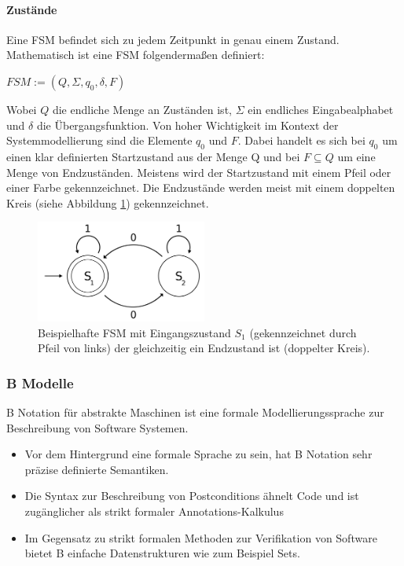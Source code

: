 \paragraph{Zustände}
Eine FSM befindet sich zu jedem Zeitpunkt in genau einem Zustand. Mathematisch ist eine FSM folgendermaßen definiert: 

\begin{center}
$FSM := (Q, \Sigma, q_0, \delta, F)$
\end{center}

Wobei $Q$ die endliche Menge an Zuständen ist, $\Sigma$ ein endliches Eingabealphabet und $\delta$ die Übergangsfunktion. Von hoher Wichtigkeit im Kontext der Systemmodellierung sind die Elemente $q_0$ und $F$. Dabei handelt es sich bei $q_0$ um einen klar definierten Startzustand aus der Menge Q und bei $F \subseteq Q$ um eine Menge von Endzuständen. Meistens wird der Startzustand mit einem Pfeil oder einer Farbe gekennzeichnet. Die Endzustände werden meist mit einem doppelten Kreis (siehe Abbildung \ref{fig:fsm_example}) gekennzeichnet.

\begin{figure}[h] 
  \centering
     \includegraphics[width=0.5\textwidth]{figures/FSM_example.png}
  \caption{Beispielhafte FSM mit Eingangszustand $S_1$ (gekennzeichnet durch Pfeil von links) der gleichzeitig ein Endzustand ist (doppelter Kreis).}
  \label{fig:fsm_example}
\end{figure}

\subsubsection{B Modelle}
B Notation für abstrakte Maschinen ist eine formale Modellierungssprache zur Beschreibung von Software Systemen.
\begin{itemize}
\item Vor dem Hintergrund eine formale Sprache zu sein, hat B Notation sehr präzise definierte Semantiken.
\item Die Syntax zur Beschreibung von Postconditions ähnelt Code und ist zugänglicher als strikt formaler Annotations-Kalkulus 
\item Im Gegensatz zu strikt formalen Methoden zur Verifikation von Software bietet B einfache Datenstrukturen wie zum Beispiel Sets.
\end{itemize}

